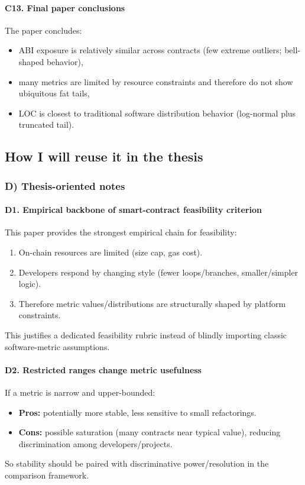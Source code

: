 \documentclass[11pt,a4paper]{article}
\begin{document}
\paragraph{C13. Final paper conclusions}
The paper concludes:
\begin{itemize}[leftmargin=*]
  \item ABI exposure is relatively similar across contracts (few extreme outliers; bell-shaped behavior),
  \item many metrics are limited by resource constraints and therefore do not show ubiquitous fat tails,
  \item LOC is closest to traditional software distribution behavior (log-normal plus truncated tail).
\end{itemize}

\subsection{How I will reuse it in the thesis}
\subsubsection*{D) Thesis-oriented notes}
\paragraph{D1. Empirical backbone of smart-contract feasibility criterion}
This paper provides the strongest empirical chain for feasibility:
\begin{enumerate}[leftmargin=*]
  \item On-chain resources are limited (size cap, gas cost).
  \item Developers respond by changing style (fewer loops/branches, smaller/simpler logic).
  \item Therefore metric values/distributions are structurally shaped by platform constraints.
\end{enumerate}
This justifies a dedicated feasibility rubric instead of blindly importing classic software-metric assumptions.

\paragraph{D2. Restricted ranges change metric usefulness}
If a metric is narrow and upper-bounded:
\begin{itemize}[leftmargin=*]
  \item \textbf{Pros:} potentially more stable, less sensitive to small refactorings.
  \item \textbf{Cons:} possible saturation (many contracts near typical value), reducing discrimination among developers/projects.
\end{itemize}
So stability should be paired with discriminative power/resolution in the comparison framework.
\end{document}
